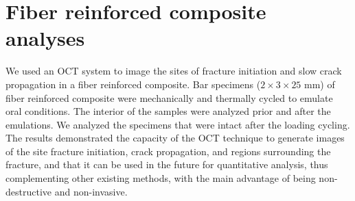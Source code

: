 \documentclass[12pt,twoside,english]{book}
\renewcommand{\~}{\perispomeni}%
\numberwithin{equation}{section}
\numberwithin{figure}{section}
\begin{document}
%

\section{Fiber reinforced composite analyses}
\label{section:Fiber reinforeced composite analyses}

We used an \gls{OCT} system to image the sites of fracture initiation and slow crack propagation in a fiber reinforced composite. Bar specimens ($2\times3\times25$ mm) of fiber reinforced composite were mechanically and thermally cycled to emulate oral conditions. The interior of the samples were analyzed prior and after the emulations. We analyzed the specimens that were intact after the loading cycling. The results demonstrated the capacity of the OCT technique to generate images of the site fracture initiation, crack propagation, and regions surrounding the fracture, and that it can be used in the future for quantitative analysis, thus complementing other existing methods, with the main advantage of being non-destructive and non-invasive.

\end{document}
